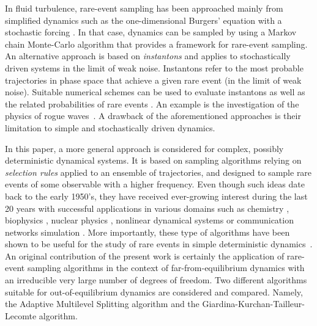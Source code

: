 \documentclass[pre,aps,floatfix,10pt,superscriptaddress, notitlepage,preprint]{revtex4-1}
\newcommand{\EL}[1]{{\color{myred}{#1}}}
\begin{document}
%
In fluid turbulence, rare-event sampling has been approached mainly from simplified dynamics such as the one-dimensional Burgers' equation with a stochastic forcing \cite{bec_burgers_2007}. In that case, dynamics can be sampled by using a Markov chain Monte-Carlo algorithm \cite{duben_monte_2008,mesterhazy2011anomalous,mesterhazy2013lattice} that provides a framework for rare-event sampling.
%
An alternative approach is based on \emph{instantons} \cite{gurarie_instantons_1996,grafke2015instanton} and applies to stochastically driven systems in the limit of weak noise.
Instantons refer to the most probable trajectories in phase space that achieve a given rare event (in the limit of weak noise). Suitable numerical schemes can be used to evaluate instantons as well as the related probabilities of rare events \cite{chernykh_large_2001,grafke_instanton_2013,grigorio_instantons_2017,laurie2015computation,bouchet2014langevin}.
An example is the investigation of the physics of rogue waves~\cite{dematteis2018rogue,dematteis2019experimental}.
%
A drawback of the aforementioned approaches is their limitation to simple and stochastically driven dynamics.
%

%
In this paper, a more general approach is considered for complex, possibly deterministic dynamical systems.
It is based on sampling algorithms relying on \emph{selection rules} applied to an ensemble of trajectories, and designed to sample rare events of some observable with a higher frequency.
%    
%
Even though such ideas date back to the early 1950's, they have received ever-growing interest during the last 20 years with successful applications in various domains such as chemistry \cite{van_erp_elaborating_2005,escobedo_transition_2009,teo_adaptive_2016}, biophysics \cite{huber_weighted-ensemble_1996,zuckerman2017weighted,bolhuis2005kinetic}, nuclear physics \cite{louvin2017}, nonlinear dynamical systems \cite{tailleur_probing_2007} or communication networks simulation \cite{villen-altamirano_restart:_1994}.
More importantly, these type of algorithms have been shown to be useful for the study of rare events in simple deterministic dynamics~\cite{wouters2016rare}.
%
%
An original contribution of the present work is certainly the application of rare-event sampling algorithms in the context of far-from-equilibrium dynamics with an irreducible very large number of degrees of freedom. 
% 
Two different algorithms suitable for out-of-equilibrium dynamics are considered and compared. Namely, the Adaptive Multilevel Splitting algorithm and the Giardina-Kurchan-Tailleur-Lecomte algorithm.
%
	
\end{document}
